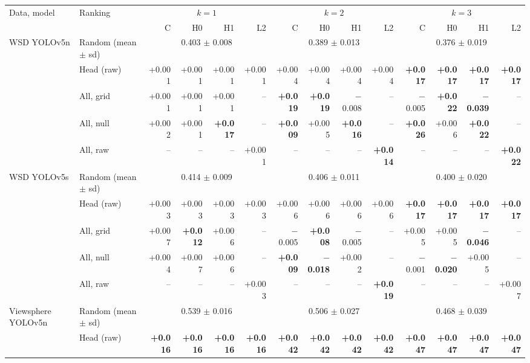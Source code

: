 \begin{tabular}{llrrrrrrrrrrrr}
\toprule
Data, model & Ranking & \multicolumn{4}{c}{$k=1$} & \multicolumn{4}{c}{$k=2$} & \multicolumn{4}{c}{$k=3$} \\
\cmidrule(lr){3-6}\cmidrule(lr){7-10}\cmidrule(lr){11-14}
 & & C & H0 & H1 & L2 & C & H0 & H1 & L2 & C & H0 & H1 & L2 \\
\midrule
WSD YOLOv5n & Random (mean $\pm$ sd) & \multicolumn{4}{c}{0.403 $\pm$ 0.008} & \multicolumn{4}{c}{0.389 $\pm$ 0.013} & \multicolumn{4}{c}{0.376 $\pm$ 0.019} \\
 & Head (raw) & +0.001 & +0.001 & +0.001 & +0.001 & +0.004 & +0.004 & +0.004 & +0.004 & \textbf{+0.017} & \textbf{+0.017} & \textbf{+0.017} & \textbf{+0.017} \\
 & All, grid & +0.001 & +0.001 & +0.001 & -- & \textbf{+0.019} & \textbf{+0.019} & $-$0.008 & -- & $-$0.005 & \textbf{+0.022} & \textbf{$-$0.039} & -- \\
 & All, null & +0.002 & +0.001 & \textbf{+0.017} & -- & \textbf{+0.009} & +0.005 & \textbf{+0.016} & -- & \textbf{+0.026} & +0.006 & \textbf{+0.022} & -- \\
 & All, raw & -- & -- & -- & +0.001 & -- & -- & -- & \textbf{+0.014} & -- & -- & -- & \textbf{+0.022} \\
\midrule
WSD YOLOv5s & Random (mean $\pm$ sd) & \multicolumn{4}{c}{0.414 $\pm$ 0.009} & \multicolumn{4}{c}{0.406 $\pm$ 0.011} & \multicolumn{4}{c}{0.400 $\pm$ 0.020} \\
 & Head (raw) & +0.003 & +0.003 & +0.003 & +0.003 & +0.006 & +0.006 & +0.006 & +0.006 & \textbf{+0.017} & \textbf{+0.017} & \textbf{+0.017} & \textbf{+0.017} \\
 & All, grid & +0.007 & \textbf{+0.012} & +0.006 & -- & $-$0.005 & \textbf{+0.008} & $-$0.005 & -- & +0.005 & +0.005 & \textbf{$-$0.046} & -- \\
 & All, null & +0.004 & +0.007 & +0.006 & -- & \textbf{+0.009} & \textbf{$-$0.018} & +0.002 & -- & $-$0.001 & \textbf{$-$0.020} & +0.005 & -- \\
 & All, raw & -- & -- & -- & +0.003 & -- & -- & -- & \textbf{+0.019} & -- & -- & -- & +0.007 \\
\midrule
Viewsphere YOLOv5n & Random (mean $\pm$ sd) & \multicolumn{4}{c}{0.539 $\pm$ 0.016} & \multicolumn{4}{c}{0.506 $\pm$ 0.027} & \multicolumn{4}{c}{0.468 $\pm$ 0.039} \\
 & Head (raw) & \textbf{+0.016} & \textbf{+0.016} & \textbf{+0.016} & \textbf{+0.016} & \textbf{+0.042} & \textbf{+0.042} & \textbf{+0.042} & \textbf{+0.042} & \textbf{+0.047} & \textbf{+0.047} & \textbf{+0.047} & \textbf{+0.047} \\

\end{tabular}
